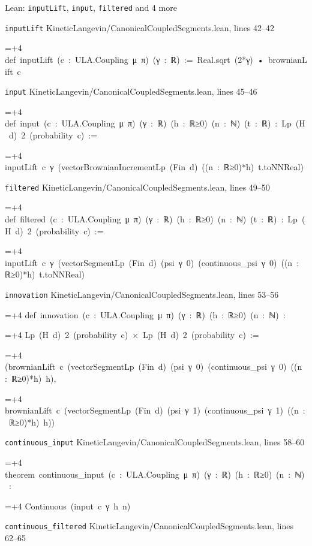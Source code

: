 \documentclass[11pt,a4paper]{article}
\newlength{\leancharwidth}
\newenvironment{leancode}{\par\smallskip\begingroup\ttfamily\footnotesize\raggedright
  \settowidth{\leancharwidth}{M}\setlength{\parskip}{0pt}\setlength{\parindent}{0pt}
  \frenchspacing}{\par\endgroup\smallskip}
\newcommand{\leanline}[2]{\hangindent=\dimexpr#1\leancharwidth+4\leancharwidth\relax
  \hangafter=1\noindent\hspace*{#1\leancharwidth}#2\par}
\newcommand{\leansource}[1]{\par{\footnotesize\color{leanmuted}#1}\par}
\begin{document}
\begin{leanbox}{Lean: \texttt{inputLift}, \texttt{input}, \texttt{filtered} and 4 more}
\leansource{\texttt{inputLift} \quad KineticLangevin/\allowbreak{}CanonicalCoupledSegments.lean, lines 42–42}
\begin{leancode}
\leanline{0}{def\ inputLift\ (c\ :\ ULA.Coupling\ μ\ π)\ (γ\ :\ ℝ)\ :=\ Real.sqrt\ (2*γ)\ •\ brownianLift\ c}
\end{leancode}
\leansource{\texttt{input} \quad KineticLangevin/\allowbreak{}CanonicalCoupledSegments.lean, lines 45–46}
\begin{leancode}
\leanline{0}{def\ input\ (c\ :\ ULA.Coupling\ μ\ π)\ (γ\ :\ ℝ)\ (h\ :\ ℝ≥0)\ (n\ :\ ℕ)\ (t\ :\ ℝ)\ :\ Lp\ (H\ d)\ 2\ (probability\ c)\ :=}
\leanline{2}{inputLift\ c\ γ\ (vectorBrownianIncrementLp\ (Fin\ d)\ ((n\ :\ ℝ≥0)*h)\ t.toNNReal)}
\end{leancode}
\leansource{\texttt{filtered} \quad KineticLangevin/\allowbreak{}CanonicalCoupledSegments.lean, lines 49–50}
\begin{leancode}
\leanline{0}{def\ filtered\ (c\ :\ ULA.Coupling\ μ\ π)\ (γ\ :\ ℝ)\ (h\ :\ ℝ≥0)\ (n\ :\ ℕ)\ (t\ :\ ℝ)\ :\ Lp\ (H\ d)\ 2\ (probability\ c)\ :=}
\leanline{2}{inputLift\ c\ γ\ (vectorSegmentLp\ (Fin\ d)\ (psi\ γ\ 0)\ (continuous\_psi\ γ\ 0)\ ((n\ :\ ℝ≥0)*h)\ t.toNNReal)}
\end{leancode}
\leansource{\texttt{innovation} \quad KineticLangevin/\allowbreak{}CanonicalCoupledSegments.lean, lines 53–56}
\begin{leancode}
\leanline{0}{def\ innovation\ (c\ :\ ULA.Coupling\ μ\ π)\ (γ\ :\ ℝ)\ (h\ :\ ℝ≥0)\ (n\ :\ ℕ)\ :}
\leanline{4}{Lp\ (H\ d)\ 2\ (probability\ c)\ ×\ Lp\ (H\ d)\ 2\ (probability\ c)\ :=}
\leanline{2}{(brownianLift\ c\ (vectorSegmentLp\ (Fin\ d)\ (psi\ γ\ 0)\ (continuous\_psi\ γ\ 0)\ ((n\ :\ ℝ≥0)*h)\ h),}
\leanline{3}{brownianLift\ c\ (vectorSegmentLp\ (Fin\ d)\ (psi\ γ\ 1)\ (continuous\_psi\ γ\ 1)\ ((n\ :\ ℝ≥0)*h)\ h))}
\end{leancode}
\leansource{\texttt{continuous\_\allowbreak{}input} \quad KineticLangevin/\allowbreak{}CanonicalCoupledSegments.lean, lines 58–60}
\begin{leancode}
\leanline{0}{theorem\ continuous\_input\ (c\ :\ ULA.Coupling\ μ\ π)\ (γ\ :\ ℝ)\ (h\ :\ ℝ≥0)\ (n\ :\ ℕ)\ :}
\leanline{4}{Continuous\ (input\ c\ γ\ h\ n)}
\end{leancode}
\leansource{\texttt{continuous\_\allowbreak{}filtered} \quad KineticLangevin/\allowbreak{}CanonicalCoupledSegments.lean, lines 62–65}
\begin{leancode}

\end{leancode}
\end{leanbox}
\end{document}
